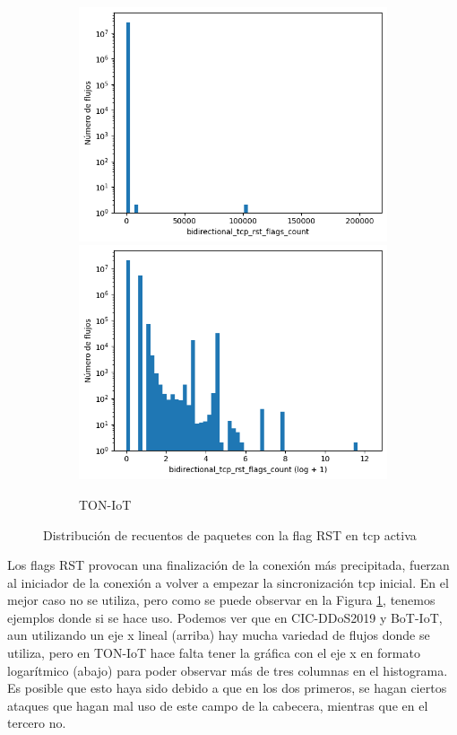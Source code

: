 \begin{figure}[H]
\begin{subfigure}[b]{0.32\textwidth}
        \includegraphics[width=\linewidth]{media/packet_pincer_toniot/bidirectional_tcp_rst_flags_count_linear_x_log_y.png}
        \includegraphics[width=\linewidth]{media/packet_pincer_toniot/bidirectional_tcp_rst_flags_count_log_x_log_y.png}
        \caption{TON-IoT}
    \end{subfigure}
    \hfill
       \caption{Distribución de recuentos de paquetes con la flag RST en \acrshort{tcp} activa}
       \label{fig:packet_pincer_bidirectional_tcp_rst_flags_count}
\end{figure}

Los flags RST provocan una finalización de la conexión más precipitada, fuerzan al iniciador de la conexión a volver a empezar la sincronización \acrshort{tcp} inicial. En el mejor caso no se utiliza, pero como se puede observar en la Figura \ref{fig:packet_pincer_bidirectional_tcp_rst_flags_count}, tenemos ejemplos donde si se hace uso. Podemos ver que en CIC-DDoS2019 y BoT-IoT, aun utilizando un eje x lineal (arriba) hay mucha variedad de flujos donde se utiliza, pero en TON-IoT hace falta tener la gráfica con el eje x en formato logarítmico (abajo) para poder observar más de tres columnas en el histograma. Es posible que esto haya sido debido a que en los dos primeros, se hagan ciertos ataques que hagan mal uso de este campo de la cabecera, mientras que en el tercero no.

